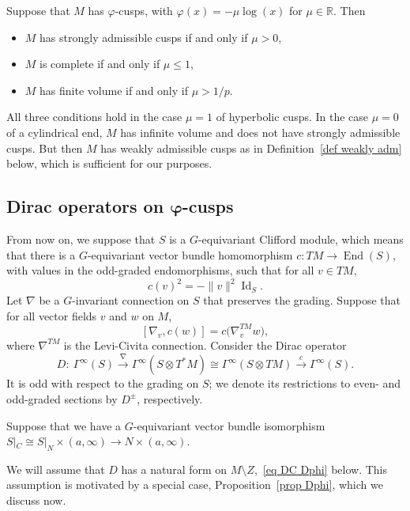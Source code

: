 \documentclass[pdftex]{sigma}%
\numberwithin{equation}{section}
\DeclareMathOperator{\Id}{Id}
\DeclareMathOperator{\End}{End}
\newcommand{\R}{\mathbb{R}}
\begin{document}
\begin{Example}\label{ex mu log x}
Suppose that $M$ has {$\varphi$-cusps}, with $\varphi(x) = -\mu \log(x)$ for $\mu \in \R$. Then
\begin{itemize}\itemsep=0pt
\item
$M$ has strongly admissible {cusps} if and only if $\mu>0$,
\item $M$ is complete if and only if $\mu \leq 1$,
\item $M$ has finite volume if and only if $\mu > 1/p$.
\end{itemize}
All three conditions hold in the case $\mu = 1$ of hyperbolic cusps. In the case $\mu = 0$ of a cylindrical end, $M$ has infinite volume and does not have strongly admissible cusps. But then $M$ has weakly admissible cusps as in Definition~\ref{def weakly adm} below, which is sufficient for our purposes.
\end{Example}

\subsection[Dirac operators on varphi-cusps]{Dirac operators on $\boldsymbol{\varphi}$-cusps}

From now on, we suppose that $S$ is a $G$-equivariant Clifford module, which means that there is a $G$-equivariant vector bundle homomorphism $c\colon TM \to \End(S)$, with values in the odd-graded endomorphisms, such that for all $v \in TM$,
\[
c(v)^2 = -\|v\|^2 \Id_S.
\]
Let $\nabla$ be a $G$-invariant connection on $S$ that preserves the grading. Suppose that for all vector fields $v$ and $w$ on $M$,
\begin{equation} \label{eq Clifford conn}
[\nabla_v, c(w)] = c\big(\nabla^{TM}_v w\big),
\end{equation}
where $\nabla^{TM}$ is the Levi-Civita connection. Consider the Dirac operator
\begin{equation} \label{eq Dirac}
D\colon\ \Gamma^{\infty}(S) \xrightarrow{\nabla} \Gamma^{\infty}(S \otimes T^*M) \cong
 \Gamma^{\infty}(S \otimes TM) \xrightarrow{c} \Gamma^{\infty}(S).
\end{equation}
It is odd with respect to the grading on $S$; we denote its restrictions to even- and odd-graded sections by $D^{\pm}$, respectively.

Suppose that we have a $G$-equivariant vector bundle isomorphism $S|_{C} \cong S|_N \times (a,\infty) \to N \times (a, \infty)$.

We will assume that $D$ has a natural form on $M\setminus Z$,~\eqref{eq DC Dphi} below.
This assumption is motivated by a special case, Proposition~\ref{prop Dphi}, which we discuss now.
\end{document}

